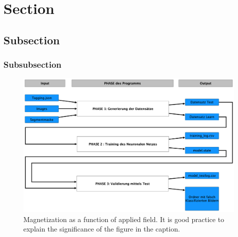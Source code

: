 \documentclass[journal,twoside,web]{ieeecolor}
\begin{document}
\section{Section}
\subsection{Subsection}
\subsubsection{Subsubsection}


\begin{figure}[!t]
    \centerline{\includegraphics[width=\columnwidth]{Architektur.png}}
    \caption{Magnetization as a function of applied field.
    It is good practice to explain the significance of the figure in the caption.}
    \label{fig:fig1}
\end{figure}
\end{document}
